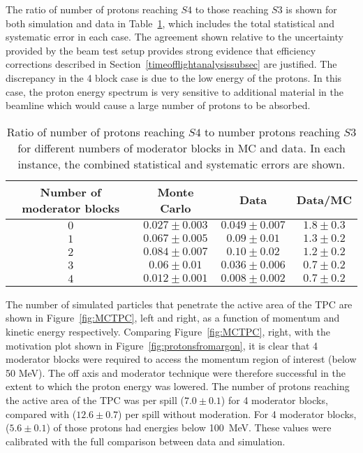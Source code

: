 The ratio of number of protons reaching $\mathit{S4}$ to those reaching $\mathit{S3}$ is shown for both simulation and data in Table~\ref{tab:ratios}, which includes the total statistical and systematic error in each case.
The agreement shown relative to the uncertainty provided by the beam test setup provides strong evidence that efficiency corrections described in Section~\ref{timeofflightanalysissubsec} are justified.
The discrepancy in the 4 block case is due to the low energy of the protons.
In this case, the proton energy spectrum is very sensitive to additional material in the beamline which would cause a large number of protons to be absorbed.

\begin{table}
  \centering
  \caption{Ratio of number of protons reaching $\mathit{S4}$ to number protons reaching $\mathit{S3}$ for different numbers of moderator blocks in MC and data. In each instance, the combined statistical and systematic errors are shown.}
  \begin{tabular}{c|c c c}
    \hline
    \hline
    Number of moderator blocks & Monte Carlo & Data & Data/MC\\
    \hline
    $0$ & $0.027 \pm 0.003$ & $0.049 \pm 0.007$ & $1.8 \pm 0.3$ \\
    $1$ & $0.067 \pm 0.005$ & $0.09 \pm 0.01$ & $1.3 \pm 0.2$ \\
    $2$ & $0.084 \pm 0.007$ & $0.10 \pm 0.02$ & $1.2 \pm 0.2$ \\
    $3$ & $0.06 \pm 0.01$ & $0.036 \pm 0.006$ & $0.7 \pm 0.2$ \\
    $4$ & $0.012 \pm 0.001$ & $0.008 \pm 0.002$ & $0.7 \pm 0.2$ \\
    \hline
  \end{tabular}
  \label{tab:ratios}
\end{table}

The number of simulated particles that penetrate the active area of the TPC are shown in Figure~\ref{fig:MCTPC}, left and right, as a function of momentum and kinetic energy respectively.
Comparing Figure~\ref{fig:MCTPC}, right, with the motivation plot shown in Figure~\ref{fig:protonsfromargon}, it is clear that 4 moderator blocks were required to access the momentum region of interest (below 50 MeV).
The off axis and moderator technique were therefore successful in the extent to which the proton energy was lowered.
The number of protons reaching the active area of the TPC was  per spill ($7.0 \pm  0.1$) for 4 moderator blocks, compared with ($12.6 \pm 0.7$) per spill without moderation. 
For 4 moderator blocks, ($5.6 \pm  0.1$) of those protons had energies below 100~MeV.
These values were calibrated with the full comparison between data and simulation.

